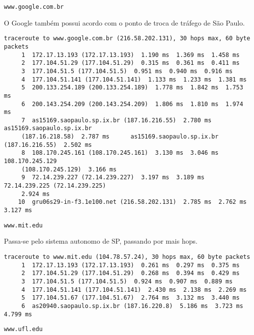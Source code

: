 \begin{parts}
\begin{subparts}
    \subpart
    \verb|www.google.com.br|

    \begin{solution}
      O Google também possui acordo com o ponto de troca de tráfego de 
      São Paulo.

    \begin{Verbatim}[label={\$ traceroute www.google.com.br}, fontsize=\footnotesize]
    traceroute to www.google.com.br (216.58.202.131), 30 hops max, 60 byte packets
     1  172.17.13.193 (172.17.13.193)  1.190 ms  1.369 ms  1.458 ms
     2  177.104.51.29 (177.104.51.29)  0.315 ms  0.361 ms  0.411 ms
     3  177.104.51.5 (177.104.51.5)  0.951 ms  0.940 ms  0.916 ms
     4  177.104.51.141 (177.104.51.141)  1.133 ms  1.233 ms  1.381 ms
     5  200.133.254.189 (200.133.254.189)  1.778 ms  1.842 ms  1.753 ms
     6  200.143.254.209 (200.143.254.209)  1.806 ms  1.810 ms  1.974 ms
     7  as15169.saopaulo.sp.ix.br (187.16.216.55)  2.780 ms as15169.saopaulo.sp.ix.br 
     (187.16.218.58)  2.787 ms      as15169.saopaulo.sp.ix.br (187.16.216.55)  2.502 ms
     8  108.170.245.161 (108.170.245.161)  3.130 ms  3.046 ms 108.170.245.129 
     (108.170.245.129)  3.166 ms
     9  72.14.239.227 (72.14.239.227)  3.197 ms  3.189 ms 72.14.239.225 (72.14.239.225)  
     2.924 ms
    10  gru06s29-in-f3.1e100.net (216.58.202.131)  2.785 ms  2.762 ms  3.127 ms
    \end{Verbatim}
    \end{solution}

    \subpart
    \verb|www.mit.edu|

    \begin{solution}
      Passa-se pelo sistema autonomo de SP, passando por mais hops.

    \begin{Verbatim}[label={\$ traceroute www.mit.edu}, fontsize=\footnotesize]
    traceroute to www.mit.edu (104.78.57.24), 30 hops max, 60 byte packets
     1  172.17.13.193 (172.17.13.193)  0.261 ms  0.297 ms  0.375 ms
     2  177.104.51.29 (177.104.51.29)  0.268 ms  0.394 ms  0.429 ms
     3  177.104.51.5 (177.104.51.5)  0.924 ms  0.907 ms  0.889 ms
     4  177.104.51.141 (177.104.51.141)  2.430 ms  2.138 ms  2.269 ms
     5  177.104.51.67 (177.104.51.67)  2.764 ms  3.132 ms  3.440 ms
     6  as20940.saopaulo.sp.ix.br (187.16.220.8)  5.186 ms  3.723 ms  4.799 ms
    \end{Verbatim}
    \end{solution}

    \subpart
    \verb|www.ufl.edu|


\end{subparts}
\end{parts}
